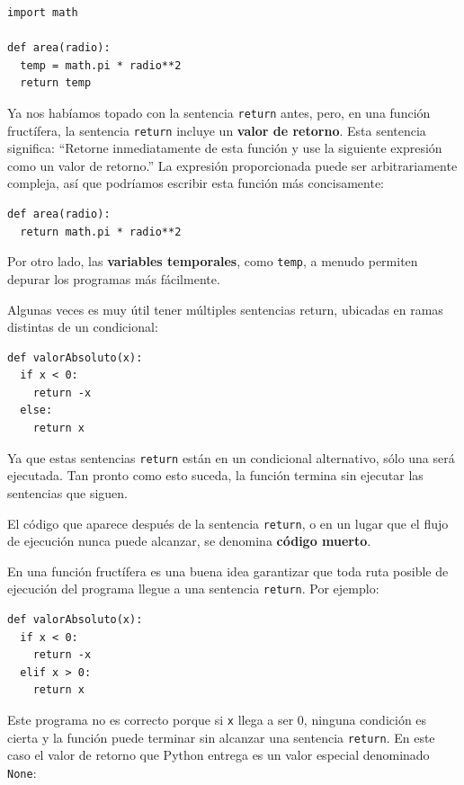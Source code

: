 \beforeverb
\begin{verbatim}
import math

def area(radio):
  temp = math.pi * radio**2
  return temp
\end{verbatim}
\afterverb
%

Ya nos habíamos topado con la sentencia \texttt{return} antes, pero, en una
función fructífera, la sentencia \texttt{return}  incluye un {\bf valor de retorno}.  
Esta sentencia significa: ``Retorne inmediatamente de esta función
y use la siguiente expresión como un valor de retorno.''
La expresión proporcionada puede ser arbitrariamente compleja, así que 
podríamos escribir esta función más concisamente:

\beforeverb
\begin{verbatim}
def area(radio):
  return math.pi * radio**2
\end{verbatim}
\afterverb
%

Por otro lado, las {\bf  variables temporales}, como \texttt{temp}, a  menudo
permiten depurar los programas más fácilmente.


Algunas veces es muy útil tener múltiples sentencias return, ubicadas
en ramas distintas de un condicional:

\beforeverb
\begin{verbatim}
def valorAbsoluto(x):
  if x < 0:
    return -x
  else:
    return x
\end{verbatim}
\afterverb
%
Ya que estas sentencias \texttt{return} están en un condicional alternativo,
sólo una será ejecutada. Tan pronto como esto suceda, la función termina
sin ejecutar las sentencias que siguen.

El código que aparece después de la sentencia  \texttt{return}, o en un lugar
que el flujo de ejecución nunca puede alcanzar, se denomina {\bf código muerto}.


En una función fructífera es una buena idea garantizar que toda ruta posible
de ejecución del programa llegue a una sentencia \texttt{return}.  Por ejemplo:

\beforeverb
\begin{verbatim}
def valorAbsoluto(x):
  if x < 0:
    return -x
  elif x > 0:
    return x
\end{verbatim}
\afterverb
%
Este programa no es correcto porque si \texttt{x} llega a ser 0,
ninguna condición es cierta y la función puede terminar sin alcanzar
una sentencia \texttt{return}. En este caso el valor de retorno que 
Python entrega es un valor especial denominado \texttt{None}:


